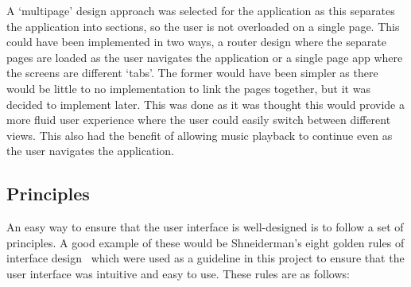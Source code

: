A `multipage' design approach was selected for the application as this separates the application into sections, so the user is not overloaded on a single page. This could have been implemented in two ways, a router design where the separate pages are loaded as the user navigates the application or a single page app where the screens are different `tabs'. The former would have been simpler as there would be little to no implementation to link the pages together, but it was decided to implement later. This was done as it was thought this would provide a more fluid user experience where the user could easily switch between different views. This also had the benefit of allowing music playback to continue even as the user navigates the application.

\subsection{Principles}
An easy way to ensure that the user interface is well-designed is to follow a set of principles. A good example of these would be Shneiderman's eight golden rules of interface design~\cite{Shneiderman} which were used as a guideline in this project to ensure that the user interface was intuitive and easy to use. These rules are as follows:
